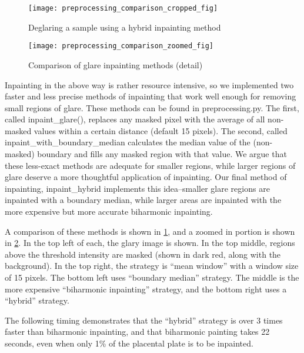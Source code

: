         \begin{figure} 
        \texttt{[image: preprocessing\_comparison\_cropped\_fig]}
        \caption{Deglaring a sample using a hybrid inpainting method}
        \label{fig:glare-example-crop}
        \end{figure}

        \begin{figure}[t] \centering
        \texttt{[image: preprocessing\_comparison\_zoomed\_fig]}
        \caption{Comparison of glare inpainting methods (detail)}
        \label{fig:glare-example-zoom}
        \end{figure}
    
    Inpainting in the above way is rather resource intensive, so we implemented two faster and less precise methods of inpainting that work well enough for removing small regions of glare.
    These methods can be found in \textrm{preprocessing.py}. The first, called 
    \textrm{inpaint\_glare()}, replaces any masked pixel with the average of all non-masked values within a certain distance (default 15 pixels). The second, called \textrm{inpaint\_with\_boundary\_median} calculates the median value of the  (non-masked) boundary and fills any masked region with that value. We argue that these less-exact methods are adequate for smaller regions, while larger regions of glare deserve a more thoughtful application of inpainting. Our final method of inpainting, \textrm{inpaint\_hybrid} implements this idea--smaller glare regions are inpainted with a boundary median, while larger areas are inpainted with the more expensive but more accurate biharmonic inpainting.
    
    A comparison of these methods is shown in \cref{fig:glare-example-crop},
    and a zoomed in portion is shown in \cref{fig:glare-example-zoom}.
    In the top left of each, the glary image is shown.  In the top middle,
    regions above the threshold intensity are masked (shown in dark red, along with the background). In the top right, the strategy is ``mean window'' with a window size of 15 pixels. The bottom left uses ``boundary median'' strategy. The middle is the more expensive ``biharmonic inpainting'' strategy, and the bottom right uses a ``hybrid'' strategy.
    
    The following timing demonstrates that the ``hybrid'' strategy is over 3 times faster than biharmonic inpainting, and that biharmonic painting takes 22 seconds, even when only 1\% of the placental plate is to be inpainted.
    
